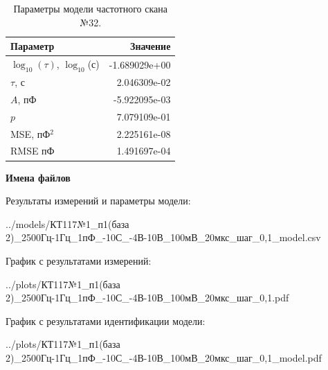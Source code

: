 \begin{table}[!ht]
    \centering
    \caption{Параметры модели частотного скана №32.}
    \begin{tabular}{|l|r|}
        \hline
        Параметр                                       & Значение                  \\ \hline
        $\log_{10}(\tau)$, $\log_{10}$(с)              & -1.689029e+00             \\ \hline
        $\tau$, с                                      & 2.046309e-02              \\ \hline
        $A$, пФ                                        & -5.922095e-03             \\ \hline
        $p$                                            & 7.079109e-01              \\ \hline
        MSE, пФ$^2$                                    & 2.225161e-08              \\ \hline
        RMSE пФ                                        & 1.491697e-04              \\ \hline
    \end{tabular}
    \label{table:frequency_scan_model_32}
\end{table}

\textbf{Имена файлов}

Результаты измерений и параметры модели:

\scriptsize../models/КТ117№1\_п1(база 2)\_2500Гц-1Гц\_1пФ\_-10С\_-4В-10В\_100мВ\_20мкс\_шаг\_0,1\_model.csv
\normalsize

График с результатами измерений:

\scriptsize../plots/КТ117№1\_п1(база 2)\_2500Гц-1Гц\_1пФ\_-10С\_-4В-10В\_100мВ\_20мкс\_шаг\_0,1.pdf
\normalsize

График с результатами идентификации модели:

\scriptsize../plots/КТ117№1\_п1(база 2)\_2500Гц-1Гц\_1пФ\_-10С\_-4В-10В\_100мВ\_20мкс\_шаг\_0,1\_model.pdf
\normalsize

